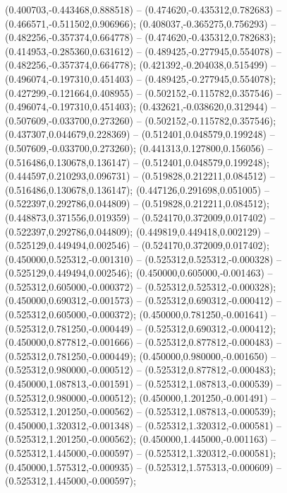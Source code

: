  (0.400703,-0.443468,0.888518) -- (0.474620,-0.435312,0.782683) -- (0.466571,-0.511502,0.906966);
 (0.408037,-0.365275,0.756293) -- (0.482256,-0.357374,0.664778) -- (0.474620,-0.435312,0.782683);
 (0.414953,-0.285360,0.631612) -- (0.489425,-0.277945,0.554078) -- (0.482256,-0.357374,0.664778);
 (0.421392,-0.204038,0.515499) -- (0.496074,-0.197310,0.451403) -- (0.489425,-0.277945,0.554078);
 (0.427299,-0.121664,0.408955) -- (0.502152,-0.115782,0.357546) -- (0.496074,-0.197310,0.451403);
 (0.432621,-0.038620,0.312944) -- (0.507609,-0.033700,0.273260) -- (0.502152,-0.115782,0.357546);
 (0.437307,0.044679,0.228369) -- (0.512401,0.048579,0.199248) -- (0.507609,-0.033700,0.273260);
 (0.441313,0.127800,0.156056) -- (0.516486,0.130678,0.136147) -- (0.512401,0.048579,0.199248);
 (0.444597,0.210293,0.096731) -- (0.519828,0.212211,0.084512) -- (0.516486,0.130678,0.136147);
 (0.447126,0.291698,0.051005) -- (0.522397,0.292786,0.044809) -- (0.519828,0.212211,0.084512);
 (0.448873,0.371556,0.019359) -- (0.524170,0.372009,0.017402) -- (0.522397,0.292786,0.044809);
 (0.449819,0.449418,0.002129) -- (0.525129,0.449494,0.002546) -- (0.524170,0.372009,0.017402);
 (0.450000,0.525312,-0.001310) -- (0.525312,0.525312,-0.000328) -- (0.525129,0.449494,0.002546);
 (0.450000,0.605000,-0.001463) -- (0.525312,0.605000,-0.000372) -- (0.525312,0.525312,-0.000328);
 (0.450000,0.690312,-0.001573) -- (0.525312,0.690312,-0.000412) -- (0.525312,0.605000,-0.000372);
 (0.450000,0.781250,-0.001641) -- (0.525312,0.781250,-0.000449) -- (0.525312,0.690312,-0.000412);
 (0.450000,0.877812,-0.001666) -- (0.525312,0.877812,-0.000483) -- (0.525312,0.781250,-0.000449);
 (0.450000,0.980000,-0.001650) -- (0.525312,0.980000,-0.000512) -- (0.525312,0.877812,-0.000483);
 (0.450000,1.087813,-0.001591) -- (0.525312,1.087813,-0.000539) -- (0.525312,0.980000,-0.000512);
 (0.450000,1.201250,-0.001491) -- (0.525312,1.201250,-0.000562) -- (0.525312,1.087813,-0.000539);
 (0.450000,1.320312,-0.001348) -- (0.525312,1.320312,-0.000581) -- (0.525312,1.201250,-0.000562);
 (0.450000,1.445000,-0.001163) -- (0.525312,1.445000,-0.000597) -- (0.525312,1.320312,-0.000581);
 (0.450000,1.575312,-0.000935) -- (0.525312,1.575313,-0.000609) -- (0.525312,1.445000,-0.000597);
